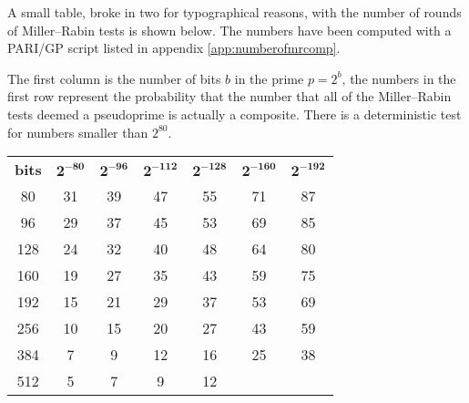 \documentclass[synpaper]{book}
\begin{document}
A small table, broke in two for typographical reasons, with the number of rounds of Miller--Rabin
tests is shown below. The numbers have been computed with a PARI/GP script listed in appendix
\ref{app:numberofmrcomp}.

The first column is the number of bits $b$ in the prime $p = 2^b$, the numbers in the first row
represent the probability that the number that all of the Miller--Rabin tests deemed a pseudoprime
is actually a composite. There is a deterministic test for numbers smaller than $2^{80}$.

\begin{table}[h]
  \begin{center}
    \begin{tabular}{c c c c c c c}
      \textbf{bits} & $\mathbf{2^{-80}}$  & $\mathbf{2^{-96}}$  & $\mathbf{2^{-112}}$ &
      $\mathbf{2^{-128}}$
                    & $\mathbf{2^{-160}}$ & $\mathbf{2^{-192}}$
      \\
      80            & 31                  & 39                  & 47                  & 55
                    & 71                  & 87                                             \\
      96            & 29                  & 37                  & 45                  & 53
                    & 69                  & 85                                             \\
      128           & 24                  & 32                  & 40                  & 48
                    & 64                  & 80                                             \\
      160           & 19                  & 27                  & 35                  & 43
                    & 59                  & 75                                             \\
      192           & 15                  & 21                  & 29                  & 37
                    & 53                  & 69                                             \\
      256           & 10                  & 15                  & 20                  & 27
                    & 43                  & 59                                             \\
      384           & 7                   & 9                   & 12                  & 16
                    & 25                  & 38                                             \\
      512           & 5                   & 7                   & 9                   & 12

\end{tabular}
\end{center}
\end{table}
\end{document}
